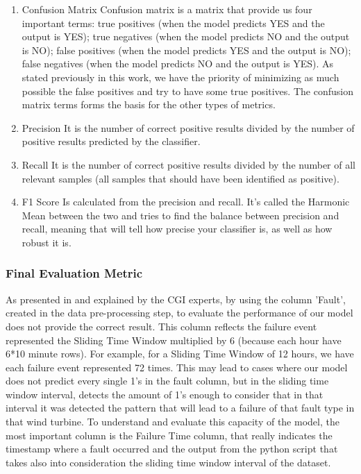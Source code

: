 \begin{enumerate}
    \item{Confusion Matrix}
Confusion matrix is a matrix that provide us four important terms: true positives (when the model predicts YES and the output is YES); true negatives (when the model predicts NO and the output is NO); false positives (when the model predicts YES and the output is NO); false negatives (when the model predicts NO and the output is YES).
As stated previously in this work, we have the priority of minimizing as much possible the false positives and try to have some true positives.
The confusion matrix terms forms the basis for the other types of metrics.

    \item{Precision}
It is the number of correct positive results divided by the number of positive results predicted by the classifier.


    \item{Recall}
It is the number of correct positive results divided by the number of all relevant samples (all samples that should have been identified as positive).


    \item{F1 Score}
Is calculated from the precision and recall. It's called the Harmonic Mean between the two and tries to find the balance between precision and recall, meaning that will tell how precise your classifier is, as well as how robust it is.
    
    
\end{enumerate}

\subsubsection{Final Evaluation Metric}
As presented in \cite{MED_1} and explained by the CGI experts, by using the column 'Fault', created in the data pre-processing step, to evaluate the performance of our model does not provide the correct result. This column reflects the failure event represented the Sliding Time Window multiplied by 6 (because each hour have 6*10 minute rows). For example, for a Sliding Time Window of 12 hours, we have each failure event represented 72 times. This may lead to cases where our model does not predict every single 1's in the fault column, but in the sliding time window interval, detects the amount of 1's enough to consider that in that interval it was detected the pattern that will lead to a failure of that fault type in that wind turbine. To understand and evaluate this capacity of the model, the most important column is the Failure Time column, that really indicates the timestamp where a fault occurred and the output from the python script that takes also into consideration the sliding time window interval of the dataset.

